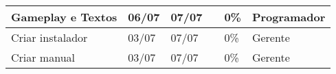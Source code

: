 \documentclass[a4paper, 11pt]{article} %
\begin{document}
\begin{table}[h]
\begin{tabular}{|l|l|l|l|l|l|}
Gameplay e Textos                            & 06/07           & 07/07        &                    & 0\%                & Programador          \\ \hline
Criar instalador                             & 03/07           & 07/07        &                    & 0\%                & Gerente              \\ \hline
Criar manual                                 & 03/07           & 07/07        &                    & 0\%                & Gerente              \\ \hline
\end{tabular}
\end{table}
\end{document}
